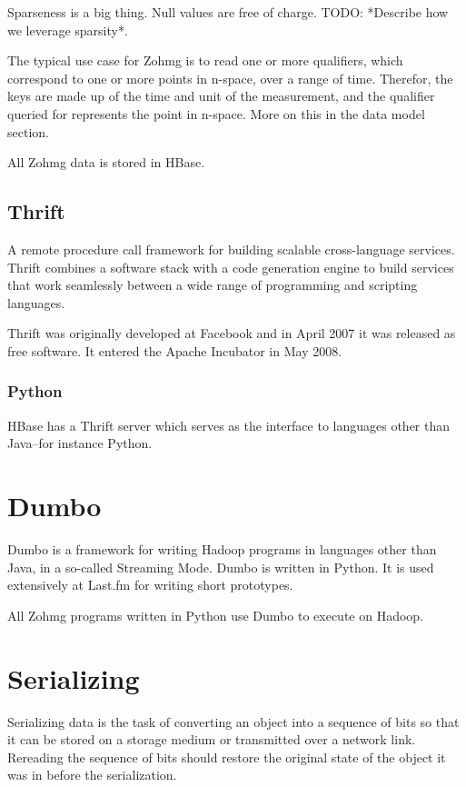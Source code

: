 \documentclass[a4paper,10pt]{book}
\begin{document}
Sparseness is a big thing. Null values are free of charge. TODO: *Describe how we leverage sparsity*.

The typical use case for Zohmg is to read one or more qualifiers, which correspond to one or more points in n-space, over a range of time.  Therefor, the keys are made up of the time and unit of the measurement, and the qualifier queried for represents the point in n-space. More on this in the data model section.

All Zohmg data is stored in HBase.


\subsection{Thrift}

A remote procedure call framework for building scalable cross-language
services. Thrift combines a software stack with a code generation engine to
build services that work seamlessly between a wide range of programming and
scripting languages. \cite{thrift}

Thrift was originally developed at Facebook and in April 2007 it was
released as free software. It entered the Apache Incubator in May 2008.


\subsubsection{Python}

HBase has a Thrift server which serves as the interface to languages other
than Java--for instance Python.



\section{Dumbo}

Dumbo is a framework for writing Hadoop programs in languages other than Java, in a so-called Streaming Mode. Dumbo is written in Python. It is used extensively at Last.fm for writing short prototypes.

All Zohmg programs written in Python use Dumbo to execute on Hadoop.



\section{Serializing}

Serializing data is the task of converting an object into a sequence of
bits so that it can be stored on a storage medium or transmitted over a
network link. Rereading the sequence of bits should restore the original
state of the object it was in before the serialization.
\end{document}
